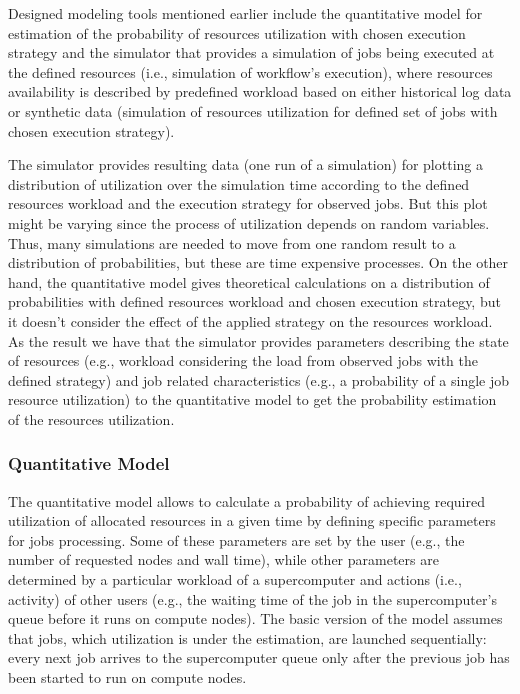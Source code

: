 Designed modeling tools mentioned earlier include the quantitative model for
estimation of the probability of resources utilization with chosen execution
strategy and the simulator that provides a simulation of jobs being executed at
the defined resources (i.e., simulation of workflow's execution), where
resources availability is described by predefined workload based on either
historical log data or synthetic data (simulation of resources utilization for
defined set of jobs with chosen execution strategy).

The simulator provides resulting data (one run of a simulation) for plotting a
distribution of utilization over the simulation time according to the defined
resources workload and the execution strategy for observed jobs.
But this plot might be varying since the process of utilization depends on
random variables.
Thus, many simulations are needed to move from one random result to a
distribution of probabilities, but these are time expensive processes.
On the other hand, the quantitative model gives theoretical calculations on a
distribution of probabilities with defined resources workload and chosen
execution strategy, but it doesn't consider the effect of the applied strategy
on the resources workload.
As the result we have that the simulator provides parameters describing the
state of resources (e.g., workload considering the load from observed jobs with
the defined strategy) and job related characteristics (e.g., a probability of
a single job resource utilization) to the quantitative model to get the
probability estimation of the resources utilization.

\subsubsection{Quantitative Model}
\label{sec-strategy-2-1}

The quantitative model allows to calculate a probability of achieving
required utilization of allocated resources in a given time by defining
specific parameters for jobs processing.
Some of these parameters are set by the user (e.g., the number of requested
nodes and wall time), while other parameters are determined by a particular
workload of a supercomputer and actions (i.e., activity) of other users (e.g.,
the waiting time of the job in the supercomputer's queue before it runs on
compute nodes).
The basic version of the model assumes that jobs, which utilization is under the
estimation, are launched sequentially: every next job arrives to the
supercomputer queue only after the previous job has been started to run on
compute nodes.

